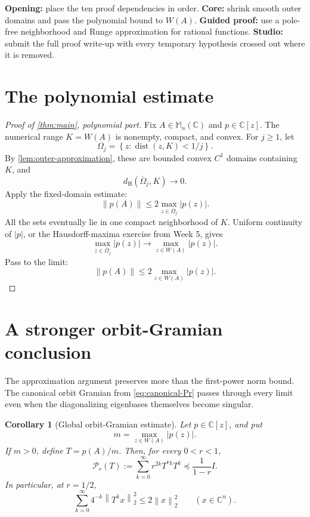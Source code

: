 \documentclass[11pt,oneside,openany]{book}
\newtheorem{corollary}[theorem]{Corollary}
\theoremstyle{definition}
\theoremstyle{remark}
\newcommand{\C}{\mathbb C}
\newcommand{\Mn}{\mathbb M_n(\C)}
\newcommand{\dist}{\operatorname{dist}}
\newcommand{\norm}[1]{\left\lVert #1\right\rVert}
\newcommand{\set}[1]{\left\{#1\right\}}
\begin{document}
\begin{workshopplan}
\textbf{Opening:} place the ten proof dependencies in order.
\textbf{Core:} shrink smooth outer domains and pass the polynomial
bound to \(W(A)\). \textbf{Guided proof:} use a pole-free neighborhood
and Runge approximation for rational functions.
\textbf{Studio:} submit the full proof write-up with every temporary
hypothesis crossed out where it is removed.
\end{workshopplan}

\section{The polynomial estimate}

\begin{proof}[Proof of \cref{thm:main}, polynomial part]
Fix \(A\in\Mn\) and \(p\in\C[z]\).
The numerical range \(K=W(A)\) is nonempty, compact, and convex.
For \(j\geq1\), let
\[
  \Omega_j=\set{z:\dist(z,K)<1/j}.
\]
By \cref{lem:outer-approximation}, these are bounded convex \(C^1\)
domains containing \(K\), and
\[
  d_{\mathrm H}(\overline\Omega_j,K)\to0.
\]
Apply the fixed-domain estimate:
\[
  \norm{p(A)}
  \leq2\max_{z\in\overline\Omega_j}|p(z)|.
\]
All the sets eventually lie in one compact neighborhood of \(K\).
Uniform continuity of \(|p|\), or the Hausdorff-maxima exercise from
Week 5, gives
\[
  \max_{z\in\overline\Omega_j}|p(z)|
  \longrightarrow
  \max_{z\in W(A)}|p(z)|.
\]
Pass to the limit:
\[
  \norm{p(A)}
  \leq2\max_{z\in W(A)}|p(z)|.
\]
\end{proof}

\section{A stronger orbit-Gramian conclusion}

The approximation argument preserves more than the first-power norm
bound.  The canonical orbit Gramian from
\eqref{eq:canonical-Pr} passes through every limit even when the
diagonalizing eigenbases themselves become singular.

\begin{corollary}[Global orbit-Gramian estimate]
\label{cor:global-orbit-gramian}
Let \(p\in\C[z]\), and put
\[
  m=\max_{z\in W(A)}|p(z)|.
\]
If \(m>0\), define \(T=p(A)/m\).  Then, for every \(0<r<1\),
\begin{equation}
  \mathcal P_r(T)
  :=
  \sum_{k=0}^{\infty}r^{2k}T^{*k}T^k
  \preceq\frac1{1-r}I.
  \label{eq:global-orbit-gramian}
\end{equation}
In particular, at \(r=1/2\),
\begin{equation}
  \sum_{k=0}^{\infty}4^{-k}
  \norm{T^kx}_2^2
  \leq2\norm{x}_2^2
  \qquad(x\in\C^n).
  \label{eq:half-orbit-square-function}
\end{equation}
\end{corollary}
\end{document}
